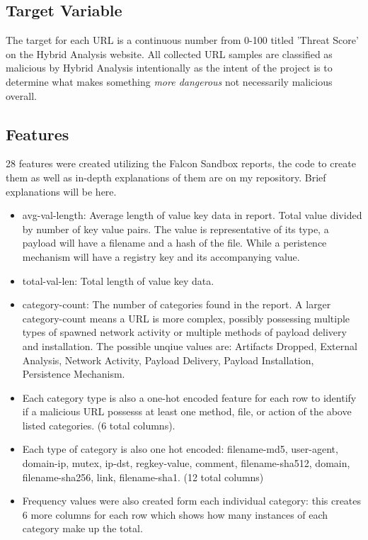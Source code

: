 \documentclass[conference]{IEEEtran}
\begin{document}
\subsection{Target Variable}

The target for each URL is a continuous number from 0-100 titled 'Threat Score' on the Hybrid Analysis website. All collected URL samples are classified as malicious by Hybrid Analysis intentionally as the intent of the project is to determine what makes something \textit{more dangerous} not necessarily malicious overall.

\subsection{Features}

28 features were created utilizing the Falcon Sandbox reports, the code to create them as well as in-depth explanations of them are on my repository. Brief explanations will be here.

\begin{itemize}
	\item avg-val-length: Average length of value key data in report. Total value divided by number of key value pairs. The value is representative of its type, a payload will have a filename and a hash of the file. While a peristence mechanism will have a registry key and its accompanying value.\\

	\item total-val-len: Total length of value key data.\\

	\item category-count: The number of categories found in the report. A larger category-count means a URL is more complex, possibly possessing multiple types of spawned network activity or multiple methods of payload delivery and installation. The possible unqiue values are: Artifacts Dropped, External Analysis, Network Activity, Payload Delivery, Payload Installation, Persistence Mechanism.\\

	\item Each category type is also a one-hot encoded feature for each row to identify if a malicious URL possesss at least one method, file, or action of the above listed categories. (6 total columns).\\

	\item Each type of category is also one hot encoded: filename-md5, user-agent, domain-ip, mutex, ip-dst, regkey-value, comment, filename-sha512, domain, filename-sha256, link, filename-sha1. (12 total columns)\\

	\item Frequency values were also created form each individual category: this creates 6 more columns for each row which shows how many instances of each category make up the total.\\

\end{itemize}
\end{document}
